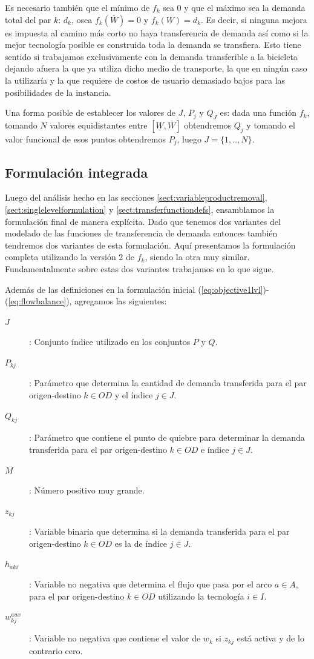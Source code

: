 \documentclass{article}
\begin{document}
  Es necesario también que el mínimo de $f_k$ sea 0 y que el máximo sea la demanda total del par $k$: $d_k$, osea $f_k(\overline{W}) = 0$ y $f_k(\underline{W}) = d_k$. Es decir, si ninguna mejora es impuesta al camino más corto no haya transferencia de demanda así como si la mejor tecnología posible es construida toda la demanda se transfiera. Esto tiene sentido si trabajamos exclusivamente con la demanda transferible a la bicicleta dejando afuera la que ya utiliza dicho medio de transporte, la que en ningún caso la utilizaría y la que requiere de costos de usuario demasiado bajos para las posibilidades de la instancia.

  Una forma posible de establecer los valores de $J$, $P_j$ y $Q_J$ es: dada una función $f_k$, tomando $N$ valores equidistantes entre $[\underline{W}, \overline{W}]$ obtendremos $Q_j$ y tomando el valor funcional de esos puntos obtendremos $P_j$, luego $J=\{1,..,N\}$.

  \subsection{Formulación integrada}
  \label{sect:alltogether}

  Luego del análisis hecho en las secciones \ref{sect:variableproductremoval}, \ref{sect:singlelevelformulation} y \ref{sect:transferfunctiondefs}, ensamblamos la formulación final de manera explícita. Dado que tenemos dos variantes del modelado de las funciones de transferencia de demanda entonces también tendremos dos variantes de esta formulación. Aquí presentamos la formulación completa utilizando la versión 2 de $f_k$, siendo la otra muy similar. Fundamentalmente sobre estas dos variantes trabajamos en lo que sigue.

  Además de las definiciones en la formulación inicial (\ref{eq:objective1lvl})-(\ref{eq:flowbalance}), agregamos las siguientes:

  \begin{description}
    \item[$J$]: Conjunto índice utilizado en los conjuntos $P$ y $Q$.
    \item[$P_{kj}$]: Parámetro que determina la cantidad de demanda transferida para el par origen-destino $k \in OD$ y el índice $j \in J$.
    \item[$Q_{kj}$]: Parámetro que contiene el punto de quiebre para determinar la demanda transferida para el par origen-destino $k \in OD$ e índice $j \in J$.
    \item[$M$]: Número positivo muy grande.
    \item[$z_{kj}$]: Variable binaria que determina si la demanda transferida para el par origen-destino $k \in OD$ es la de índice $j \in J$.
    \item[$h_{aki}$]: Variable no negativa que determina el flujo que pasa por el arco $a \in A$, para el par origen-destino $k \in OD$ utilizando la tecnología $i \in I$.
    \item[$w^{aux}_{kj}$]: Variable no negativa que contiene el valor de $w_{k}$ si $z_{kj}$ está activa y de lo contrario cero.
  \end{description}
\end{document}
